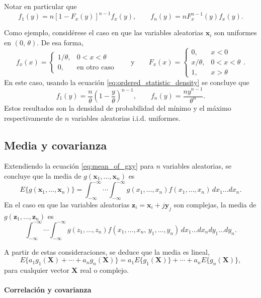 \documentclass[a4paper]{report}
\newcommand{\X}{\mathbf{X}}
\newcommand{\x}{\mathbf{x}}
\newcommand{\y}{\mathbf{y}}
\newcommand{\z}{\mathbf{z}}
\begin{document}
Notar en particular que
\[
 f_1(y)=n[1-F_x(y)]^{n-1}f_x(y),\qquad f_n(y)=nF_x^{n-1}(y)f_x(y).
\]

Como ejemplo, considérese el caso en que las variables aleatorias \(\x_i\) son uniformes en \((0,\,\theta)\). De esa forma,
\[
 f_x(x)
 =\left\{\begin{array}{ll}
   1/\theta, & 0<x<\theta\\ 
   0, & \textrm{en otro caso}
 \end{array} \right.
 \qquad\textrm{y}\qquad
 F_x(x)
 =\left\{\begin{array}{ll}
   0, & x<0\\
   x/\theta, & 0<x<\theta\\ 
   1, & x>\theta
 \end{array} \right..
\]
En este caso, usando la ecuación \ref{eq:ordered_statistic_density} se concluye que
\begin{equation}\label{eq:ordered_statistic_uniform_density}
  f_1(y)=\frac{n}{\theta}\left(1-\frac{y}{\theta}\right)^{n-1},\qquad f_n(y)=\frac{ny^{n-1}}{\theta^n}. 
\end{equation}
Estos resultados son la densidad de probabilidad del mínimo y el máximo respectivamente de \(n\) variables aleatorias i.i.d. uniformes.

\subsection{Media y covarianza}\label{sec:mean_and_covariance}

Extendiendo la ecuación \ref{eq:mean_of_gxy} para \(n\) variables aleatorias, se concluye que la media de \(g(\x_1,\dots,\x_n)\) es
\[
 E\{g(\x_1,\dots,\x_n)\}=\int_{-\infty}^{-\infty}\cdots\int_{-\infty}^{-\infty}g(x_1,\dots,x_n)f(x_1,\dots,x_n)\,dx_1\dots dx_n.
\]
En el caso en que las variables aleatorias \(\z_i=\x_i+j\y_j\) son complejas, la media de \(g(\z_1,\dots,\z_n)\) es
\[
 \int_{-\infty}^{-\infty}\cdots\int_{-\infty}^{-\infty}g(z_1,\dots,z_n)f(x_1,\dots,x_n,\,y_1,\dots,y_n)\,dx_1\dots dx_ndy_1\dots dy_n.
\]

A partir de estas consideraciones, se deduce que la media es lineal, 
\[
 E\{a_1g_1(\X)+\cdots+a_ng_n(\X)\}=a_1E\{g_1(\X)\}+\cdots+a_nE\{g_n(\X)\},
\]
para cualquier vector \(\X\) real o complejo.

\paragraph{Correlación y covarianza}
\end{document}
